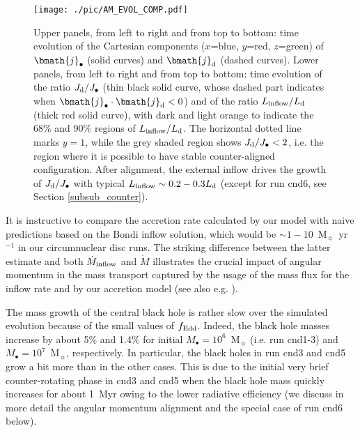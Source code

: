 \documentclass[a4paper,fleqn,usenatbib]{mnras}
\begin{document}
\begin{figure*}
\begin{center}
\texttt{[image: ./pic/AM\_EVOL\_COMP.pdf]}
\caption{Upper panels, from left to right and from top to bottom: time evolution of the Cartesian components ($x$=blue, $y$=red, $z$=green) of $\bmath{j}_{\bullet}$ (solid curves) and $\bmath{j}_{\rm d}$ (dashed curves).
Lower panels, from left to right and from top to bottom: time evolution of the ratio $J_{\rm d}/J_{\bullet}$ (thin black solid curve, whose dashed part indicates when $\bmath{j}_{\bullet} \cdot \bmath{j}_{\rm d} < 0$) and of the ratio $L_{\rm inflow} / L_{\rm d}$ (thick red solid curve), with dark and light orange to indicate the 68\% and 90\% regions of $L_{\rm inflow} / L_{\rm d}$.
The horizontal dotted line marks $y = 1$, while the grey shaded region shows $J_{\rm d} / J_{\bullet} < 2$, i.e. the region where it is possible to have stable counter-aligned configuration.
After alignment, the external inflow drives the growth of $J_{\rm d}/J_{\bullet}$ with typical $L_{\rm inflow} \sim 0.2-0.3 L_{\rm d}$ (except for run cnd6, see Section \ref{subsub_counter}).
}
\label{fig_am_comp}
\end{center}
\end{figure*}

It is instructive to compare the accretion rate calculated by our model with naive predictions based on the Bondi inflow solution, which would be $\sim 1-10$~M$_{\sun}$~yr$^{-1}$ in our circumnuclear disc runs.
The striking difference between the latter estimate and both $\dot{M}_{\rm inflow}$ and $\dot{M}$ illustrates the crucial impact of angular momentum in the mass transport captured by the usage of the mass flux for the inflow rate and by our accretion model (see also e.g. \citealt{hopkins+11,curtis+16b}).

The mass growth of the central black hole is rather slow over the simulated evolution because of the small values of $f_{\rm Edd}$.
Indeed, the black hole masses increase by about 5\% and 1.4\% for initial $M_{\bullet} = 10^6$~M$_{\sun}$ (i.e. run cnd1-3) and $M_{\bullet} = 10^{7}$~M$_{\sun}$, respectively.
In particular, the black holes in run cnd3 and cnd5 grow a bit more than in the other cases.
This is due to the initial very brief counter-rotating phase in cnd3 and cnd5 when the black hole mass quickly increases for about 1~Myr owing to the lower radiative efficiency (we discuss in more detail the angular momentum alignment and the special case of run cnd6 below). 
\end{document}
